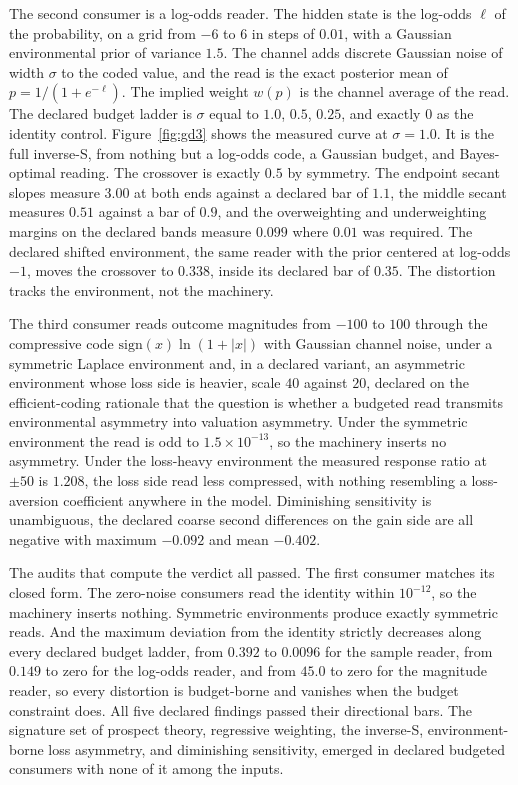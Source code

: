 \documentclass[aps,pre,reprint,nofootinbib]{revtex4-2}
\begin{document}
The second consumer is a log-odds reader.  The hidden state is the
log-odds $\ell$ of the probability, on a grid from $-6$ to $6$ in
steps of $0.01$, with a Gaussian environmental prior of variance
$1.5$.  The channel adds discrete Gaussian noise of width $\sigma$ to
the coded value, and the read is the exact posterior mean of
$p = 1/(1+e^{-\ell})$.  The implied weight $w(p)$ is the channel
average of the read.  The declared budget ladder is $\sigma$ equal to
$1.0$, $0.5$, $0.25$, and exactly $0$ as the identity control.
Figure~\ref{fig:gd3} shows the measured curve at $\sigma = 1.0$.  It
is the full inverse-S, from nothing but a log-odds code, a Gaussian
budget, and Bayes-optimal reading.  The crossover is exactly $0.5$ by
symmetry.  The endpoint secant slopes measure $3.00$ at both ends
against a declared bar of $1.1$, the middle secant measures $0.51$
against a bar of $0.9$, and the overweighting and underweighting
margins on the declared bands measure $0.099$ where $0.01$ was
required.  The declared shifted environment, the same reader with the
prior centered at log-odds $-1$, moves the crossover to $0.338$,
inside its declared bar of $0.35$.  The distortion tracks the
environment, not the machinery.

The third consumer reads outcome magnitudes from $-100$ to $100$
through the compressive code $\mathrm{sign}(x)\ln(1+\lvert x\rvert)$
with Gaussian channel noise, under a symmetric Laplace environment
and, in a declared variant, an asymmetric environment whose loss side
is heavier, scale $40$ against $20$, declared on the efficient-coding
rationale that the question is whether a budgeted read transmits
environmental asymmetry into valuation asymmetry.  Under the
symmetric environment the read is odd to $1.5\times10^{-13}$, so the
machinery inserts no asymmetry.  Under the loss-heavy environment the
measured response ratio at $\pm50$ is $1.208$, the loss side read
less compressed, with nothing resembling a loss-aversion coefficient
anywhere in the model.  Diminishing sensitivity is unambiguous, the
declared coarse second differences on the gain side are all negative
with maximum $-0.092$ and mean $-0.402$.

The audits that compute the verdict all passed.  The first consumer
matches its closed form.  The zero-noise consumers read the identity
within $10^{-12}$, so the machinery inserts nothing.  Symmetric
environments produce exactly symmetric reads.  And the maximum
deviation from the identity strictly decreases along every declared
budget ladder, from $0.392$ to $0.0096$ for the sample reader, from
$0.149$ to zero for the log-odds reader, and from $45.0$ to zero for
the magnitude reader, so every distortion is budget-borne and
vanishes when the budget constraint does.  All five declared findings
passed their directional bars.  The signature set of prospect theory,
regressive weighting, the inverse-S, environment-borne loss
asymmetry, and diminishing sensitivity, emerged in declared budgeted
consumers with none of it among the inputs.
\end{document}
